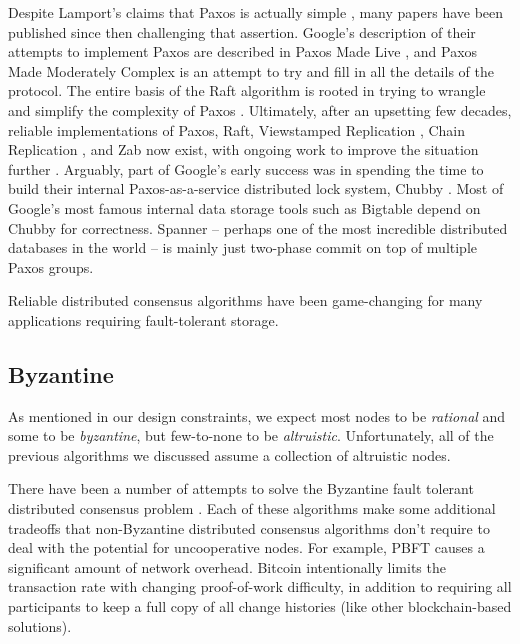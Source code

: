 \documentclass[a4paper,10pt]{article} \usepackage[utf8]{inputenc}
\begin{document}
Despite Lamport's claims that Paxos is actually simple \cite{paxos-simple},
many papers have been published since then
challenging that assertion. Google's description of their attempts to implement
Paxos are described in Paxos Made Live \cite{paxos-live},
and Paxos Made Moderately
Complex \cite{paxos-complex} is an attempt to try and fill in all the details of
the protocol. The entire basis of the Raft algorithm is rooted in trying to
wrangle and simplify the complexity of Paxos \cite{raft}. Ultimately, after an
upsetting few decades, reliable implementations of Paxos, Raft, Viewstamped
Replication \cite{vrr}, Chain Replication \cite{chain-rep}, and Zab \cite{zab}
now exist, with ongoing work to improve the situation
further \cite{epaxos,paxos-flexible}. Arguably, part of Google's early success
was in spending the time to build their internal Paxos-as-a-service distributed
lock system, Chubby \cite{chubby}. Most of Google's most famous internal data
storage tools such as Bigtable \cite{bigtable} depend on Chubby for
correctness. Spanner \cite{spanner} -- perhaps one of the most incredible
distributed databases in the world -- is mainly just two-phase commit on top of
multiple Paxos groups.

Reliable distributed consensus algorithms have been game-changing for many
applications requiring fault-tolerant storage.

\subsection{Byzantine}

As mentioned in our design constraints, we expect most nodes to be {\em
rational} and some to be {\em byzantine}, but few-to-none to be {\em
altruistic}. Unfortunately, all of the previous algorithms we discussed assume a
collection of altruistic nodes.

There have been a number of attempts to solve the Byzantine fault tolerant
distributed consensus problem
\cite{bitcoin,pbft,qu,fab,fab-revisited,zyzzyva,rbft,
tangaroa,tendermint,aliph,hashgraph,honeybadger,algorand,casper,
tangle,avalanche,parsec,mickens-bft}. Each of these algorithms make some
additional tradeoffs that non-Byzantine distributed consensus algorithms don't
require to deal with the potential for uncooperative nodes. For example,
PBFT \cite{pbft} causes a significant amount of network overhead. Bitcoin
\cite{bitcoin} intentionally limits the transaction rate with changing
proof-of-work difficulty, in addition to requiring all participants to keep a
full copy of all change histories (like other blockchain-based
solutions).
\end{document}
